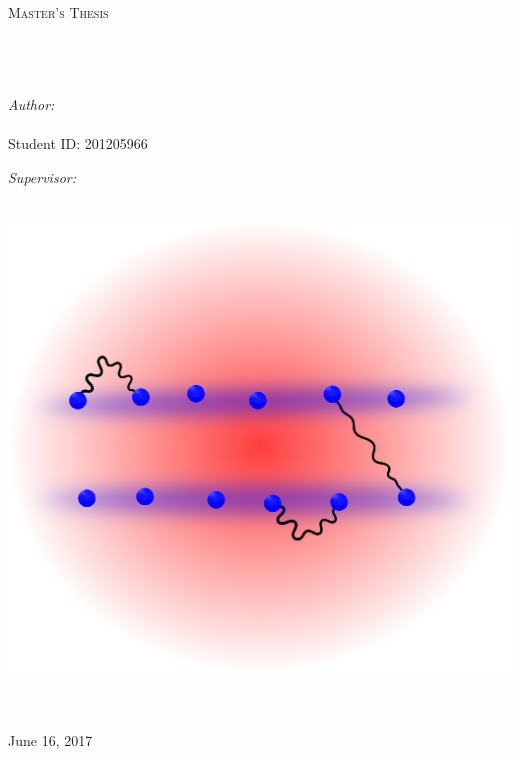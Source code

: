 \documentclass[9pt, twoside]{Thesis}
\begin{document}
\begin{titlepage}
\begin{center}

\textsc{\LARGE \univname}\\[1.5cm] %
\textsc{\Large Master's Thesis}\\[0.5cm] %

\HRule \\[0.4cm] %
{\huge \bfseries \ttitle}\\[0.4cm] %
\HRule \\[1.5cm] %
 
\begin{minipage}[t]{0.4\textwidth}
\begin{flushleft} \large
\emph{Author:}\\
{\authornames}\\ 
{Student ID: 201205966} %
\end{flushleft}
\end{minipage}%
\begin{minipage}[t]{0.4\textwidth}
\begin{flushright} \large
\emph{Supervisor:} \\
{\supname} %
\end{flushright}
\end{minipage}\\[0cm]
\vspace{2.5cm}
\includegraphics[width=0.6\columnwidth]{1D3Dsketchfrontpage.eps} 
 
\large 
\deptname \\ \facname \\[1cm] %


 
{\large June 16, 2017} %

 
\vfill
\end{center}

\end{titlepage}
\end{document}
